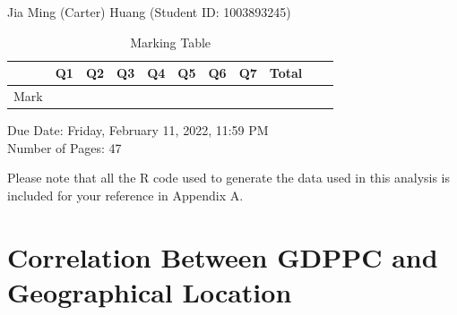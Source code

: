 \documentclass[15pt]{article}
\begin{document}
\begin{center}
Jia Ming (Carter) Huang (Student ID: 1003893245)

\begin{table}[h]
\centering
\begin{tabular}{|l|l|l|l|l|l|l|l|l|l|l|}
\hline
     & Q1 & Q2 & Q3 & Q4 & Q5 & Q6 & Q7 & Total \\ \hline
Mark &    &    &    &    &    &    &    &       \\ \hline
\end{tabular}
\caption{Marking Table}
\end{table}

Due Date: Friday, February 11, 2022, 11:59 PM \\
\indent Number of Pages: 47
\end{center}

\noindent Please note that all the R code used to generate the data used in this analysis is included for your reference in Appendix A.

\renewcommand*\contentsname{List of Problems}

\tableofcontents

\newpage

\section{Correlation Between GDPPC and Geographical Location}
\end{document}
